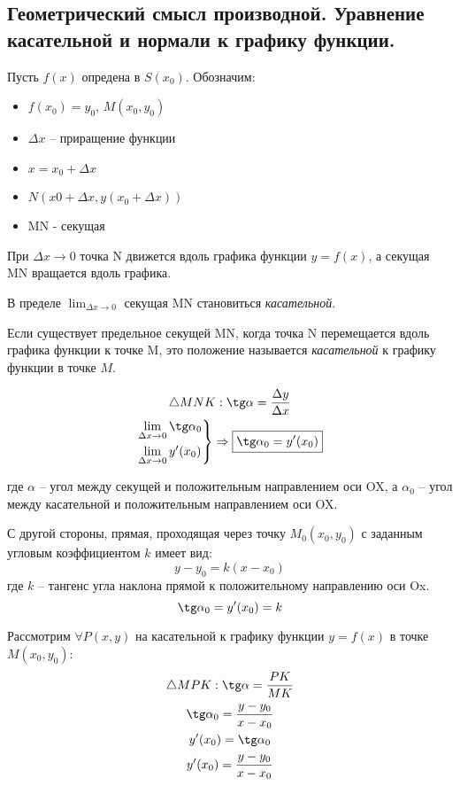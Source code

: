 \subsection{Геометрический смысл производной. Уравнение касательной и нормали к графику функции.}

Пусть $f(x)$ опредена в $S(x_0)$. 
Обозначим:
\begin{itemize}
  \item $f(x_0) = y_0$, $M(x_0, y_0)$
  \item $\Delta x$ -- приращение функции
  \item $x = x_0 + \Delta x$ 
  \item $N(x0 + \Delta x, y(x_0 + \Delta x))$
  \item MN - секущая
\end{itemize}

При $\Delta x \to 0$ точка N движется вдоль графика функции $y = f(x)$, а секущая MN вращается вдоль графика.

В пределе $\lim_{\Delta x \to 0}$ секущая MN становиться \textit{касательной}.

\begin{definition}
  Если существует предельное секущей MN, когда точка N перемещается вдоль графика функции к точке M, это положение называется \textit{касательной} к графику функции в точке $M$.
\end{definition}

\begin{gather*}
  \triangle MNK: \tg \alpha = \frac{\Delta y}{\Delta x} \\
  \begin{rcases}
    \lim_{\Delta x \to 0} \tg \alpha_0 \\
    \lim_{\Delta x \to 0} y'(x_0)
  \end{rcases} \implies \boxed{
    \tg \alpha_0 = y'(x_0)
  }
\end{gather*}

где $\alpha$ -- угол между секущей и положительным направлением оси OX, а
$\alpha_0$ -- угол между касательной и положительным направлением оси OX.

С другой стороны, прямая, проходящая через точку $M_0(x_0, y_0)$ с заданным угловым коэффициентом $k$ имеет вид: \[
y - y_0 = k(x - x_0)
\] 
где $k$ -- тангенс угла наклона прямой к положительному направлению оси Ox.  \[
\tg \alpha_0 = y'(x_0) = k
\] 

Рассмотрим $\forall P(x, y)$ на касательной к графику функции $y = f(x)$ в точке $M(x_0, y_0)$:
\begin{gather*}
  \triangle MPK: \tg \alpha = \frac{PK}{MK} \\
  \tg \alpha_0 = \frac{y - y_0}{x - x_0} \\
  y'(x_0) = \tg \alpha_0 \\
  y'(x_0) = \frac{y - y_0}{x - x_0}
\end{gather*}

